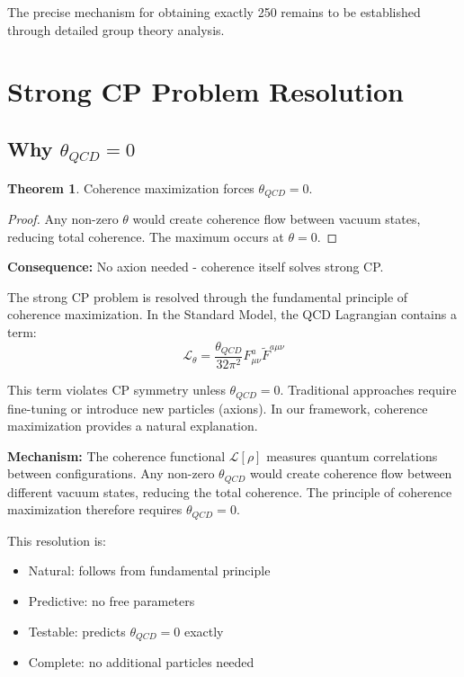 \documentclass[11pt]{article}
\theoremstyle{definition}
\newtheorem{theorem}{Theorem}[section]
\newcommand{\density}{\rho}
\begin{document}
The precise mechanism for obtaining exactly 250 remains to be established through detailed group theory analysis.

\section{Strong CP Problem Resolution}

\subsection{Why $\theta_{QCD} = 0$}

\begin{theorem}
Coherence maximization forces $\theta_{QCD} = 0$.
\end{theorem}

\begin{proof}
Any non-zero $\theta$ would create coherence flow between vacuum states, reducing total coherence. The maximum occurs at $\theta = 0$.
\end{proof}

\textbf{Consequence:} No axion needed - coherence itself solves strong CP.

The strong CP problem is resolved through the fundamental principle of coherence maximization. In the Standard Model, the QCD Lagrangian contains a term:
\begin{equation}
\mathcal{L}_{\theta} = \frac{\theta_{QCD}}{32\pi^2} F_{\mu\nu}^a \tilde{F}^{a\mu\nu}
\end{equation}

This term violates CP symmetry unless $\theta_{QCD} = 0$. Traditional approaches require fine-tuning or introduce new particles (axions). In our framework, coherence maximization provides a natural explanation.

\textbf{Mechanism:} The coherence functional $\mathcal{L}[\density]$ measures quantum correlations between configurations. Any non-zero $\theta_{QCD}$ would create coherence flow between different vacuum states, reducing the total coherence. The principle of coherence maximization therefore requires $\theta_{QCD} = 0$.

This resolution is:
\begin{itemize}
\item Natural: follows from fundamental principle
\item Predictive: no free parameters
\item Testable: predicts $\theta_{QCD} = 0$ exactly
\item Complete: no additional particles needed
\end{itemize}
\end{document}
